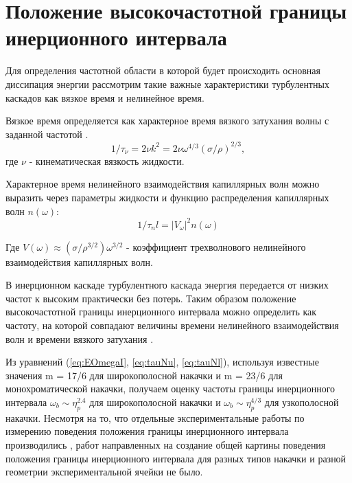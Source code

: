 \section{Положение высокочастотной границы инерционного интервала}%

Для определения частотной области в которой будет происходить основная диссипация энергии рассмотрим такие важные характеристики турбулентных каскадов как вязкое время и нелинейное время.

Вязкое время определяется как характерное время вязкого затухания волны с заданной частотой \cite[стр. 135]{land}.
\begin{equation}
\label{eq:tauNu}
1/\tau_\nu = 2\nu k^2 = 2 \nu \omega^{4/3}(\sigma/\rho)^{2/3},
\end{equation}
где $\nu$ - кинематическая вязкость жидкости.

Характерное время нелинейного взаимодействия капиллярных волн можно выразить через параметры жидкости и функцию распределения капиллярных волн $n(\omega)$:
\begin{equation}
\label{eq:tauNl}
1/\tau_nl = |V_\omega|^2 n(\omega)
\end{equation}

Где $V(\omega) \approx (\sigma/\rho^{3/2})\omega^{3/2}$ - коэффициент трехволнового нелинейного взаимодействия капиллярных волн.

В инерционном каскаде турбулентного каскада энергия передается от низких частот к высоким практически без потерь. Таким образом положение высокочастотной границы инерционного интервала можно определить как частоту, на которой совпадают величины времени нелинейного взаимодействия волн и времени вязкого затухания .

Из уравнений (\ref{eq:EOmegaI}, \ref{eq:tauNu}, \ref{eq:tauNl}), используя известные значения m = 17/6 для широкополосной накачки и m = 23/6 для монохроматической накачки, получаем оценку частоты границы инерционного интервала $\omega_b \sim \eta_p^{2.4}$ для широкополосной накачки и $\omega_b \sim \eta_p^{4/3}$ для узкополосной накачки. Несмотря на то, что отдельные экспериментальные работы по измерению поведения положения границы инерционного интервала производились \cite{Brazhnikov_bound_freq}, работ направленных на создание общей картины поведения положения границы инерционного интервала для разных типов накачки и разной геометрии экспериментальной ячейки не было.


